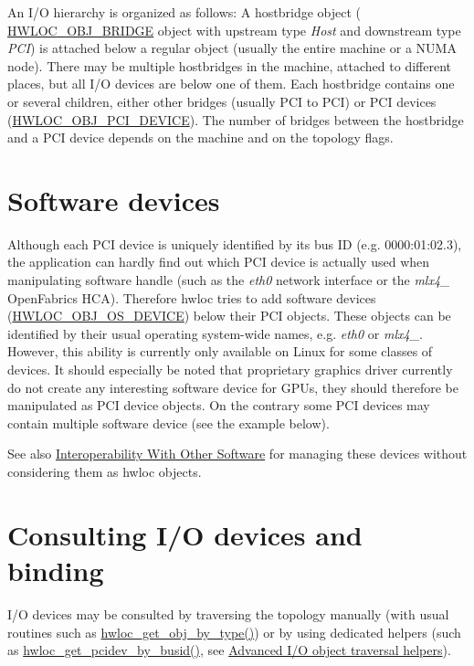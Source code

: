An I/O hierarchy is organized as follows: A hostbridge object ( {\ttfamily \hyperlink{a00041_ggacd37bb612667dc437d66bfb175a8dc55a6825f10895fea60aca7a6ba9fe273db0}{HWLOC\_\-OBJ\_\-BRIDGE}} object with upstream type {\itshape Host\/} and downstream type {\itshape PCI\/}) is attached below a regular object (usually the entire machine or a NUMA node). There may be multiple hostbridges in the machine, attached to different places, but all I/O devices are below one of them. Each hostbridge contains one or several children, either other bridges (usually PCI to PCI) or PCI devices ({\ttfamily \hyperlink{a00041_ggacd37bb612667dc437d66bfb175a8dc55a5d8117a54df1fbd3606ab19e42cb0ea9}{HWLOC\_\-OBJ\_\-PCI\_\-DEVICE}}). The number of bridges between the hostbridge and a PCI device depends on the machine and on the topology flags.\hypertarget{a00005_iodevices_osdev}{}\section{Software devices}\label{a00005_iodevices_osdev}
Although each PCI device is uniquely identified by its bus ID (e.g. 0000:01:02.3), the application can hardly find out which PCI device is actually used when manipulating software handle (such as the {\itshape eth0\/} network interface or the {\itshape mlx4\_\/} OpenFabrics HCA). Therefore hwloc tries to add software devices ({\ttfamily \hyperlink{a00041_ggacd37bb612667dc437d66bfb175a8dc55a51e7280240fd9f25589cbbe538bdb075}{HWLOC\_\-OBJ\_\-OS\_\-DEVICE}}) below their PCI objects. These objects can be identified by their usual operating system-\/wide names, e.g. {\itshape eth0\/} or {\itshape mlx4\_\/}. However, this ability is currently only available on Linux for some classes of devices. It should especially be noted that proprietary graphics driver currently do not create any interesting software device for GPUs, they should therefore be manipulated as PCI device objects. On the contrary some PCI devices may contain multiple software device (see the example below).

See also \hyperlink{a00008}{Interoperability With Other Software} for managing these devices without considering them as hwloc objects.\hypertarget{a00005_iodevices_consult}{}\section{Consulting I/O devices and binding}\label{a00005_iodevices_consult}
I/O devices may be consulted by traversing the topology manually (with usual routines such as \hyperlink{a00047_ga9be4a03488cdd0fb431e4aa1cbdea895}{hwloc\_\-get\_\-obj\_\-by\_\-type()}) or by using dedicated helpers (such as \hyperlink{a00064_ga546e1d690c63fb24177f3013ed78ceb1}{hwloc\_\-get\_\-pcidev\_\-by\_\-busid()}, see \hyperlink{a00064}{Advanced I/O object traversal helpers}).

